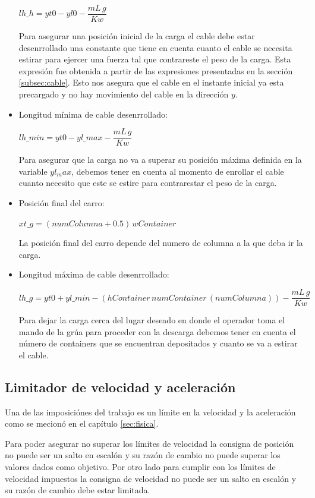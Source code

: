 \documentclass[journal]{IEEEtran}
\begin{document}
\begin{itemize}
 $lh\_h = yt0-yl0- \dfrac{mL \, g}{Kw} $ 
 
 Para asegurar una posición inicial de la carga el cable debe estar desenrrollado una 
 constante que tiene en cuenta cuanto el cable se necesita estirar para ejercer una fuerza
 tal que contrareste el peso de la carga. Esta expresión fue obtenida a partir de las 
 expresiones presentadas en la sección \ref{subsec:cable}. Esto nos asegura que el cable 
 en el instante inicial ya esta precargado y no hay movimiento del cable en la dirección
 $y$.
 
 \item Longitud mínima de cable desenrrollado: 
 
 $lh\_min = yt0 - yl\_max-\dfrac{mL \, g}{Kw}$
 
 Para asegurar que la carga no va a superar su posición máxima definida en la variable
 $yl_max$, debemos tener en cuenta al momento de enrollar el cable cuanto necesito que este
 se estire para contrarestar el peso de la carga.
 
 \item Posición final del carro:
 
 $xt\_g= (numColumna + 0.5) \, wContainer$
 
 La posición final del carro depende del numero de columna  a la que deba ir la carga.
 \item Longitud máxima de cable desenrrollado:
 
 $lh\_g= yt0 + yl\_min -  (hContainer \, numContainer \, (numColumna)) - \dfrac{mL \, g}{Kw}$
 
 Para dejar la carga cerca del lugar deseado en donde el operador toma el mando de la
 grúa para proceder con la descarga debemos tener en cuenta el número de containers que
 se encuentran depositados y cuanto se va a estirar el cable.
 
 
\end{itemize}

\subsection{Limitador de velocidad y aceleración}

Una de las imposiciónes del trabajo es un límite en la velocidad y la aceleración como se
mecionó en el capítulo \ref{sec:fisica}.

Para poder asegurar no superar los límites de velocidad la consigna de posición no puede 
ser un salto en escalón y su razón de cambio no puede superar los valores dados como 
objetivo. 
Por otro lado para cumplir con los límites de velocidad impuestos la consigna de velocidad 
no puede ser un salto en escalón y su razón de cambio debe estar limitada.
\end{document}
